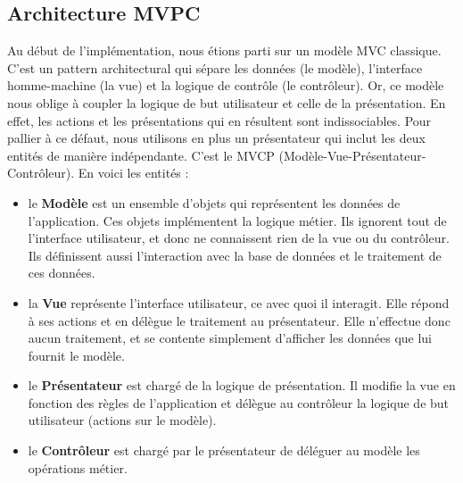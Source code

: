 \documentclass{article}
\begin{document}
\subsection{Architecture MVPC}

Au début de l'implémentation, nous étions parti sur un modèle MVC classique. C'est un pattern architectural qui sépare les données (le modèle), l'interface homme-machine (la vue) et la logique de contrôle (le contrôleur). Or, ce modèle nous oblige à coupler la logique de but utilisateur et celle de la présentation. En effet, les actions et les présentations qui en résultent sont indissociables. Pour pallier à ce défaut, nous utilisons en plus un présentateur qui inclut les deux entités de manière indépendante. C'est le MVCP (Modèle-Vue-Présentateur-Contrôleur). En voici les entités :\\

\begin{itemize}
\item le \textbf{Modèle} est un ensemble d'objets qui représentent les données de l'application. Ces objets implémentent la logique métier. Ils ignorent tout de l'interface utilisateur, et donc ne connaissent rien de la vue ou du contrôleur. Ils définissent aussi l'interaction avec la base de données et le traitement de ces données.
\item la \textbf{Vue} représente l'interface utilisateur, ce avec quoi il interagit. Elle répond à ses actions et en délègue le traitement au présentateur. Elle n'effectue donc aucun traitement, et se contente simplement d'afficher les données que lui fournit le modèle.
\item le \textbf{Présentateur} est chargé de la logique de présentation. Il modifie la vue en fonction des règles de l'application et délègue au contrôleur la logique de but utilisateur (actions sur le modèle).
\item le \textbf{Contrôleur} est chargé par le présentateur de déléguer au modèle les opérations  métier. \\
\end{itemize}
\end{document}
